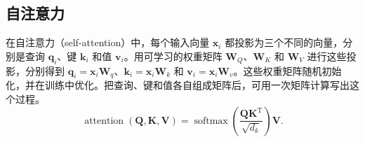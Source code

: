 \subsection{自注意力}
在自注意力（self-attention）中，每个输入向量 $\symbf{x}_i$ 都投影为三个不同的向量，分别是查询 $\symbf{q}_i$、键 $\symbf{k}_i$ 和值 $\symbf{v}_i$。用可学习的权重矩阵 $\symbf{W}_Q$、$\symbf{W}_K$ 和 $\symbf{W}_V$ 进行这些投影，分别得到 $\symbf{q}_i=\symbf{x}_i\symbf{W}_q$、$\symbf{k}_i=\symbf{x}_i\symbf{W}_k$ 和 $\symbf{v}_i=\symbf{x}_i\symbf{W}_v$。这些权重矩阵随机初始化，并在训练中优化。把查询、键和值各自组成矩阵后，可用一次矩阵计算写出这个过程。
\begin{equation}
\operatorname{attention}(\symbf{Q},\symbf{K},\symbf{V})
=\operatorname{softmax}\left(\frac{\symbf{Q}\symbf{K}^{\mathrm{T}}}{\sqrt{d_k}}\right)\symbf{V}.
\tag{2.12}
\end{equation}











